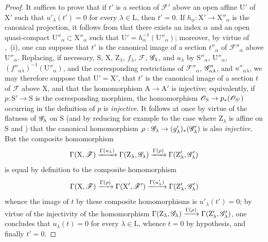 \begin{proof}
It suffices to prove that if $t'$ is a section of $\mathscr{F}'$ above an open affine $\mathrm{U}'$ of $\mathrm{X}'$ such that $u'_\lambda(t')=0$ for every $\lambda\in\mathrm{L}$, then $t'=0$.
If $h_\alpha:\mathrm{X}'\to\mathrm{X}''_\alpha$ is the canonical projection,
it follows from  that there exists an index $\alpha$ and an open quasi-compact $\mathrm{U}''_\alpha\subset\mathrm{X}''_\alpha$ such that $\mathrm{U}'=h_\alpha^{-1}(\mathrm{U}''_\alpha)$; moreover, by virtue of ,~(i), one can suppose that $t'$ is the canonical image of a section $t''_\alpha$ of $\mathscr{F}''_\alpha$ above $\mathrm{U}''_\alpha$.
Replacing, if necessary, $\mathrm{S}$, $\mathrm{X}$, $\mathrm{Z}_\lambda$, $f_\lambda$, $\mathscr{F}$, $\mathscr{G}_\lambda$, and $u_\lambda$ by $\mathrm{S}''_\alpha$, $\mathrm{U}''_\alpha$, $(f''_{\alpha\lambda})^{-1}(\mathrm{U}''_\alpha)$, and the corresponding restrictions of $\mathscr{F}''_\alpha$, $\mathscr{G}''_{\alpha\lambda}$, and $u''_{\alpha\lambda}$, we may therefore suppose that $\mathrm{U}'=\mathrm{X}'$, that $t'$ is the canonical image of a section $t$ of $\mathscr{F}$ above $\mathrm{X}$, and that the homomorphism $\mathrm{A}\to\mathrm{A}'$ is injective; equivalently, if $p:\mathrm{S}'\to\mathrm{S}$ is the corresponding morphism, the homomorphism $\mathscr{O}_\mathrm{S}\to p_*(\mathscr{O}_{\mathrm{S}'})$ occurring in the definition of $p$ is \emph{injective}.
It follows at once by virtue of the flatness of $\mathscr{G}_\lambda$ on $\mathrm{S}$ (and by reducing for example to the case where $\mathrm{Z}_\lambda$ is affine on $\mathrm{S}$  and ) that the canonical homomorphism $\rho:\mathscr{G}_\lambda\to(g'_\lambda)_*(\mathscr{G}'_\lambda)$ is also \emph{injective}.
But the composite homomorphism
\[
  \Gamma(\mathrm{X},\mathscr{F})\xrightarrow{\Gamma(u_\lambda)}\Gamma(\mathrm{Z}_\lambda,\mathscr{G}_\lambda)\xrightarrow{\Gamma(\rho)}\Gamma(\mathrm{Z}'_\lambda,\mathscr{G}'_\lambda)
\]
is equal by definition to the composite homomorphism
\[
  \Gamma(\mathrm{X},\mathscr{F})\xrightarrow{\Gamma(\rho)}\Gamma(\mathrm{X}',\mathscr{F}')\xrightarrow{\Gamma(u'_\lambda)}\Gamma(\mathrm{Z}'_\lambda,\mathscr{G}'_\lambda)
\]
whence the image of $t$ by these composite homomorphisms is $u'_\lambda(t')=0$; by virtue of the injectivity of the homomorphism $\Gamma(\mathrm{Z}_\lambda,\mathscr{G}_\lambda)\xrightarrow{\Gamma(\rho)}\Gamma(\mathrm{Z}'_\lambda,\mathscr{G}'_\lambda)$, one concludes that $u_\lambda(t)=0$ for every $\lambda\in\mathrm{L}$, whence $t=0$ by hypothesis, and finally $t'=0$.
\end{proof}

